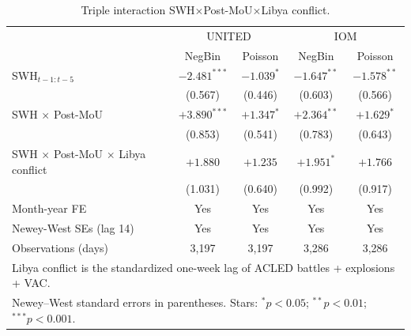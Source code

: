 \begin{table}[H]
\centering
\small
\caption{Triple interaction SWH$\times$Post-MoU$\times$Libya conflict.}
\label{tab:appx-pushfactor}
\begin{tabular}{lcccc}
\hline
                                          & \multicolumn{2}{c}{UNITED}    & \multicolumn{2}{c}{IOM} \\
                                          & NegBin & Poisson & NegBin & Poisson \\
\hline
SWH$_{t-1:t-5}$                           & $-2.481^{***}$ & $-1.039^{*}$ & $-1.647^{**}$ & $-1.578^{**}$ \\
                                          & (0.567) & (0.446) & (0.603) & (0.566) \\
SWH $\times$ Post-MoU                     & $+3.890^{***}$ & $+1.347^{*}$ & $+2.364^{**}$ & $+1.629^{*}$ \\
                                          & (0.853) & (0.541) & (0.783) & (0.643) \\
SWH $\times$ Post-MoU $\times$ Libya conflict & $+1.880$ & $+1.235$ & $+1.951^{*}$ & $+1.766$ \\
                                              & (1.031) & (0.640) & (0.992) & (0.917) \\
\hline
Month-year FE                             & Yes            & Yes           & Yes            & Yes           \\
Newey-West SEs (lag 14)                   & Yes            & Yes           & Yes            & Yes           \\
Observations (days)                       & 3,197 & 3,197 & 3,286 & 3,286 \\
\hline
\multicolumn{5}{l}{\footnotesize Libya conflict is the standardized
one-week lag of ACLED battles + explosions + VAC.} \\
\multicolumn{5}{l}{\footnotesize Newey--West standard errors in parentheses. Stars: $^{*}p<0.05$; $^{**}p<0.01$; $^{***}p<0.001$.} \\
\end{tabular}
\end{table}
